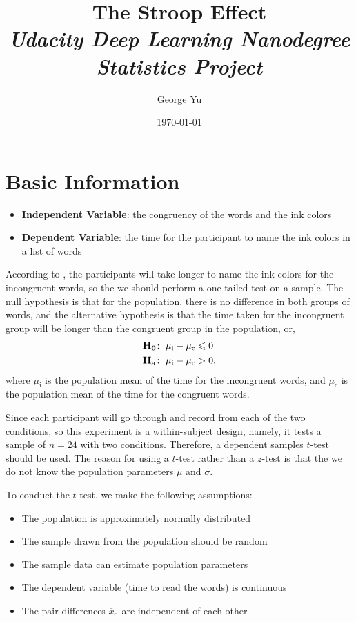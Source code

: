 \documentclass[12pt,titlepage]{article}
\title{The Stroop Effect \\ \vspace{10pt} \large{\it Udacity Deep Learning Nanodegree Statistics Project}}
\author{George Yu}
\date{\today}
\begin{document}
\maketitle

\section{Basic Information}
  \begin{itemize}
    \item {\bf Independent Variable}: the congruency of the words and the ink colors
    \item {\bf Dependent Variable}: the time for the participant to name the ink colors in a list of words
  \end{itemize}
  
  According to \cite{wiki:stroop-effect}, the participants will take longer to name the ink colors for the incongruent words, so the we should perform a one-tailed test on a sample. The null hypothesis is that for the population, there is no difference in both groups of words, and the alternative hypothesis is that the time taken for the incongruent group will be longer than the congruent group in the population, or,
  \begin{align*}
    &\mathbf{H_0}\hspace{-2pt}:\ \mu_\mathrm{i} - \mu_\mathrm{c} \leqslant 0 \\
    &\mathbf{H_a}\hspace{-2pt}:\ \mu_\mathrm{i} - \mu_\mathrm{c} > 0,
  \end{align*}
  where $\mu_\mathrm{i}$ is the population mean of the time for the incongruent words, and $\mu_\mathrm{c}$ is the population mean of the time for the congruent words.
  
  Since each participant will go through and record from each of the two conditions, so this experiment is a within-subject design, namely, it tests a sample of $n=24$ with two conditions. Therefore, a dependent samples $t$-test should be used. The reason for using a $t$-test rather than a $z$-test is that the we do not know the population parameters $\mu$ and $\sigma$.
  
  To conduct the $t$-test, we make the following assumptions:
  \begin{itemize}
    \item The population is approximately normally distributed
    \item The sample drawn from the population should be random
    \item The sample data can estimate population parameters
    \item The dependent variable (time to read the words) is continuous
    \item The pair-differences $\overline{x}_\mathrm{d}$ are independent of each other
  \end{itemize}
\end{document}
